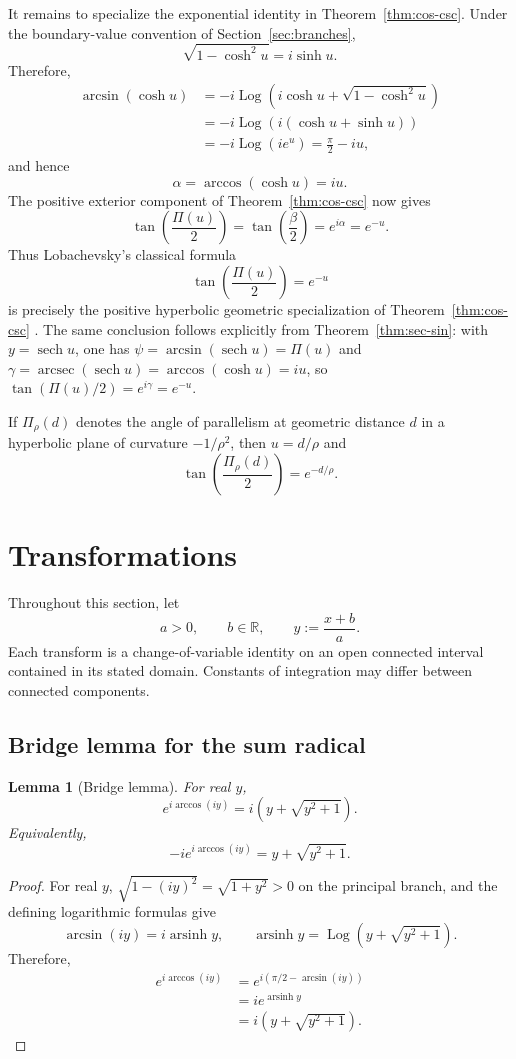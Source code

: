 \documentclass[11pt]{article}
\newtheorem{lemma}[theorem]{Lemma}
\theoremstyle{remark}
\DeclareMathOperator{\Logop}{Log}
\DeclareMathOperator{\arcsec}{arcsec}
\DeclareMathOperator{\arsinh}{arsinh}
\DeclareMathOperator{\sech}{sech}
\begin{document}
It remains to specialize the exponential identity in Theorem~\ref{thm:cos-csc}. Under the boundary-value convention of Section~\ref{sec:branches},
\[
\sqrt{1-\cosh^2u}=i\sinh u.
\]
Therefore,
\begin{align*}
\arcsin(\cosh u)
&=-i\Logop\!\left(i\cosh u+\sqrt{1-\cosh^2u}\right)\\
&=-i\Logop\!\left(i(\cosh u+\sinh u)\right)\\
&=-i\Logop(ie^u)=\frac{\pi}{2}-iu,
\end{align*}
and hence
\[
\alpha=\arccos(\cosh u)=iu.
\]
The positive exterior component of Theorem~\ref{thm:cos-csc} now gives
\[
\tan\!\left(\frac{\Pi(u)}{2}\right)
=\tan\!\left(\frac{\beta}{2}\right)
=e^{i\alpha}=e^{-u}.
\]
Thus Lobachevsky's classical formula
\[
\tan\!\left(\frac{\Pi(u)}{2}\right)=e^{-u}
\]
is precisely the positive hyperbolic geometric specialization of Theorem~\ref{thm:cos-csc} \cite[\S36]{Lobachevsky}. The same conclusion follows explicitly from Theorem~\ref{thm:sec-sin}: with $y=\sech u$, one has $\psi=\arcsin(\sech u)=\Pi(u)$ and $\gamma=\arcsec(\sech u)=\arccos(\cosh u)=iu$, so $\tan(\Pi(u)/2)=e^{i\gamma}=e^{-u}$.

If $\Pi_\rho(d)$ denotes the angle of parallelism at geometric distance $d$ in a hyperbolic plane of curvature $-1/\rho^2$, then $u=d/\rho$ and
\[
\tan\!\left(\frac{\Pi_\rho(d)}{2}\right)=e^{-d/\rho}.
\]

\section{Transformations}
\label{sec:transforms}

Throughout this section, let
\[
a>0,
\qquad b\in\mathbb R,
\qquad y:=\frac{x+b}{a}.
\]
Each transform is a change-of-variable identity on an open connected interval contained in its stated domain. Constants of integration may differ between connected components.

\subsection*{Bridge lemma for the sum radical}

\begin{lemma}[Bridge lemma]
\label{lem:bridge}
For real $y$,
\[
e^{i\arccos(iy)}=i\left(y+\sqrt{y^2+1}\right).
\]
Equivalently,
\[
-ie^{i\arccos(iy)}=y+\sqrt{y^2+1}.
\]
\end{lemma}

\begin{proof}
For real $y$, $\sqrt{1-(iy)^2}=\sqrt{1+y^2}>0$ on the principal branch, and the defining logarithmic formulas give
\[
\arcsin(iy)=i\arsinh y,
\qquad
\arsinh y=\Logop\!\left(y+\sqrt{y^2+1}\right).
\]
Therefore,
\begin{align*}
e^{i\arccos(iy)}
&=e^{i(\pi/2-\arcsin(iy))}\\
&=ie^{\arsinh y}\\
&=i\left(y+\sqrt{y^2+1}\right).
\end{align*}
\end{proof}
\end{document}
